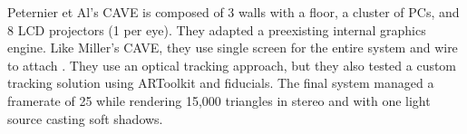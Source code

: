 \filbreak
{}

%	

Peternier et Al's CAVE is composed of 3 walls with a floor, a cluster of PCs, and 8 LCD projectors (1 per eye). They adapted a preexisting internal graphics engine. Like Miller's CAVE, they use single screen for the entire system and wire to attach \cite{miller}. They use an optical tracking approach, but they also tested a custom tracking solution using ARToolkit and fiducials. The final system managed a framerate of 25 while rendering 15,000 triangles in stereo and with one light source casting soft shadows.



\filbreak
{}

